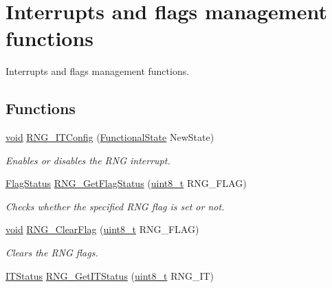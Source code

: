 \hypertarget{group___r_n_g___group3}{\section{Interrupts and flags management functions}
\label{group___r_n_g___group3}
}


Interrupts and flags management functions.  


\subsection*{Functions}
\begin{DoxyCompactItemize}
\item 
\hyperlink{group___n_a_m_e_ga18028b8badbf1ea7e704ccac3c488e82}{void} \hyperlink{group___r_n_g___group3_ga41d9be4c303ba0875a82c62dc7085f08}{R\-N\-G\-\_\-\-I\-T\-Config} (\hyperlink{group___exported__types_gac9a7e9a35d2513ec15c3b537aaa4fba1}{Functional\-State} New\-State)
\begin{DoxyCompactList}\small\item\em Enables or disables the R\-N\-G interrupt. \end{DoxyCompactList}\item 
\hyperlink{group___exported__types_ga89136caac2e14c55151f527ac02daaff}{Flag\-Status} \hyperlink{group___r_n_g___group3_gab70d6cc7d943dfb8eac15ccecf6cd7b3}{R\-N\-G\-\_\-\-Get\-Flag\-Status} (\hyperlink{stdint_8h_aba7bc1797add20fe3efdf37ced1182c5}{uint8\-\_\-t} R\-N\-G\-\_\-\-F\-L\-A\-G)
\begin{DoxyCompactList}\small\item\em Checks whether the specified R\-N\-G flag is set or not. \end{DoxyCompactList}\item 
\hyperlink{group___n_a_m_e_ga18028b8badbf1ea7e704ccac3c488e82}{void} \hyperlink{group___r_n_g___group3_gac3c67fe6bacdc4529f1707025224f954}{R\-N\-G\-\_\-\-Clear\-Flag} (\hyperlink{stdint_8h_aba7bc1797add20fe3efdf37ced1182c5}{uint8\-\_\-t} R\-N\-G\-\_\-\-F\-L\-A\-G)
\begin{DoxyCompactList}\small\item\em Clears the R\-N\-G flags. \end{DoxyCompactList}\item 
\hyperlink{group___exported__types_gaacbd7ed539db0aacd973a0f6eca34074}{I\-T\-Status} \hyperlink{group___r_n_g___group3_gab58eaab67698770d9ea9775fb280271f}{R\-N\-G\-\_\-\-Get\-I\-T\-Status} (\hyperlink{stdint_8h_aba7bc1797add20fe3efdf37ced1182c5}{uint8\-\_\-t} R\-N\-G\-\_\-\-I\-T)

\end{DoxyCompactItemize}

